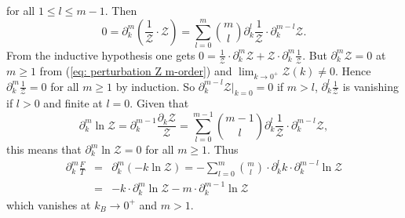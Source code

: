 \documentclass[11pt,british,reqno]{article}
\numberwithin{equation}{section}
\numberwithin{figure}{section}
\numberwithin{table}{section}
\theoremstyle{definition}
\theoremstyle{definition}
\theoremstyle{plain}
\theoremstyle{plain}
\theoremstyle{remark}
\theoremstyle{plain}
\numberwithin{equation}{section}
\numberwithin{figure}{section}
\numberwithin{table}{section}
\theoremstyle{plain}
\begin{document}
for all $1\leq l\leq m-1$. Then 
\begin{equation}
0=\partial_{k}^{m} \left(\frac{1}{\mathcal{Z}}\cdot\mathcal{Z}\right)=\sum_{l=0}^{m}{{m}\choose{l}}\partial_{k}^{l}\frac{1}{\mathcal{Z}}\cdot\partial_{k}^{m-l}\mathcal{Z}.
\label{eq: eq: perturbation Z m-order, 2} 
\end{equation}
From the inductive hypothesis one gets ${\displaystyle 0=\frac{1}{\mathcal{Z}}\cdot\partial_{k}^{m}\mathcal{Z}+\mathcal{Z}\cdot\partial_{k}^{m}\frac{1}{\mathcal{Z}}}$.
But $\partial_{k}^{m}\mathcal{Z}=0$ at $m\geq1$ from (\ref{eq: perturbation Z m-order}) and ${\displaystyle \lim_{k\rightarrow0^{+}}\mathcal{Z}(k)\neq0}$.
Hence ${\displaystyle \partial_{k}^{m}\frac{1}{\mathcal{Z}}=0}$ for
all $m\geq1$ by induction. So $\partial_{k}^{m-l}\mathcal{Z}|_{k=0}=0$ if $m>l$, ${\displaystyle \partial_{k}^{l}\frac{1}{\mathcal{Z}}}$
is vanishing if $l>0$ and finite at $l=0$. Given that 
\begin{equation}
\partial_{k}^{m}\ln\mathcal{Z}=\partial_{k}^{m-1}\frac{\partial_{k}\mathcal{Z}}{\mathcal{Z}}=\sum_{l=0}^{m-1}{{m-1}\choose{l}}\partial_{k}^{l}\frac{1}{\mathcal{Z}}\cdot\partial_{k}^{m-l}\mathcal{Z},
\label{eq: eq: perturbation Z m-order, 3}
\end{equation}
this means that $\partial_{k}^{m}\ln\mathcal{Z}=0$
for all $m\geq1$. Thus
\begin{eqnarray}
\partial_{k}^{m}\frac{F}{T} & = & \partial_{k}^{m}(-k\ln\mathcal{Z})=-\sum_{l=0}^{m}{{m}\choose{l}}\cdot\partial_{k}^{l}k\cdot\partial_{k}^{m-l}\ln\mathcal{Z}\nonumber \\ 
& = & -k\cdot\partial_{k}^{m}\ln\mathcal{Z}-m\cdot\partial_{k}^{m-1}\ln\mathcal{Z}\label{eq: m-th k-derivative F/T}
\end{eqnarray}
which vanishes at $k_{B}\rightarrow0^{+}$ and $m>1$. 


\end{document}
